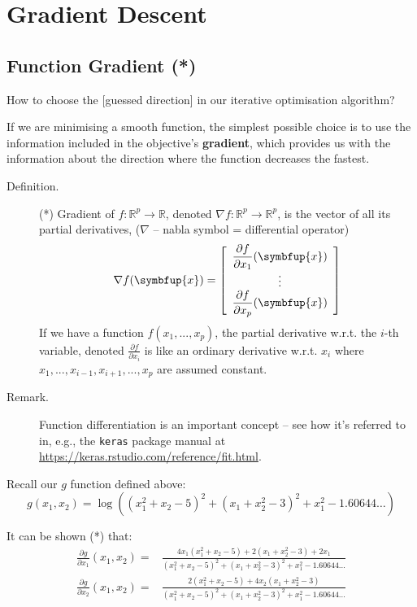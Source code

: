 \documentclass[10pt,b5paper,krantz1]{krantz}
\renewcommand{\mathbf}[1]{\symbfup{#1}}
\begin{document}
\hypertarget{gradient-descent}{%
\section{Gradient Descent}\label{gradient-descent}}

\hypertarget{function-gradient}{%
\subsection{Function Gradient (*)}\label{function-gradient}}

How to choose the {[}guessed direction{]} in our iterative optimisation algorithm?

If we are minimising a smooth function, the simplest possible choice
is to use the information included in the objective's \textbf{gradient},
which provides us with the information about the direction where the
function decreases the fastest.

\bigskip

\begin{description}
\item[Definition.]
(*) Gradient of \(f:\mathbb{R}^p\to\mathbb{R}\),
denoted \(\nabla f:\mathbb{R}^p\to\mathbb{R}^p\),
is the vector of all its partial derivatives,
(\(\nabla\) -- nabla symbol = differential operator)
\[
\nabla f(\mathbf{x}) = \left[
\begin{array}{c}
\displaystyle\frac{\partial f}{\partial x_1}(\mathbf{x})\\
\vdots\\
\displaystyle\frac{\partial f}{\partial x_p}(\mathbf{x})
\end{array}
\right]
\]
If we have a function \(f(x_1,...,x_p)\),
the partial derivative w.r.t. the \(i\)-th variable,
denoted
\(\frac{\partial f}{\partial x_i}\)
is like an ordinary derivative w.r.t. \(x_i\)
where \(x_1,...,x_{i-1},x_{i+1},...,x_p\) are assumed constant.
\item[Remark.]
Function differentiation is an important concept -- see how it's referred to
in, e.g., the \texttt{keras} package manual at \url{https://keras.rstudio.com/reference/fit.html}.
\end{description}

Recall our \(g\) function defined above:
\[
g(x_1,x_2)=\log\left((x_1^{2}+x_2-5)^{2}+(x_1+x_2^{2}-3)^{2}+x_1^2-1.60644\dots\right)
\]

It can be shown (*) that:
\[
\begin{array}{ll}
\frac{\partial g}{\partial x_1}(x_1,x_2)=&
\displaystyle\frac{
4x_1(x_1^{2}+x_2-5)+2(x_1+x_2^{2}-3)+2x_1
}{(x_1^{2}+x_2-5)^{2}+(x_1+x_2^{2}-3)^{2}+x_1^2-1.60644\dots}
\\
\frac{\partial g}{\partial x_2}(x_1,x_2)=&
\displaystyle\frac{
2(x_1^{2}+x_2-5)+4x_2(x_1+x_2^{2}-3)
}{(x_1^{2}+x_2-5)^{2}+(x_1+x_2^{2}-3)^{2}+x_1^2-1.60644\dots}
\end{array}
\]
\end{document}
